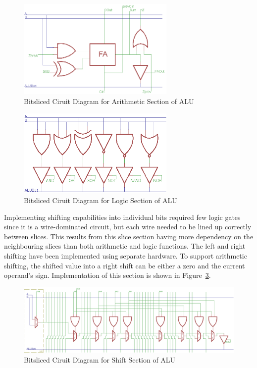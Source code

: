 \begin{figure}[h]
	\centering
	\includegraphics[width=3in]{Figures/ArithSlice.png}
	\caption{Bitsliced Ciruit Diagram for Arithmetic Section of ALU}
	\label{fig:ArithSlice}
\end{figure}

\begin{figure}[h]
	\centering
	\includegraphics[width=3in]{Figures/LogicSlice.png}
	\caption{Bitsliced Ciruit Diagram for Logic Section of ALU}
	\label{fig:LogicSlice}
\end{figure}

Implementing shifting capabilities into individual bits required few logic gates since it is a wire-dominated circuit, but each wire needed to be lined up correctly between slices. 
This results from this slice section having more dependency on the neighbouring slices than both arithmetic and logic functions. 
The left and right shifting have been implemented using separate hardware. 
To support arithmetic shifting, the shifted value into a right shift can be either a zero and the current operand's sign.
Implementation of this section is shown in Figure~\ref{fig:ShiftSlice}. 

\begin{figure}[h]
	\centering
	\includegraphics[width=\textwidth]{Figures/ShiftSlice.png}
	\caption{Bitsliced Ciruit Diagram for Shift Section of ALU}
	\label{fig:ShiftSlice}
\end{figure}

